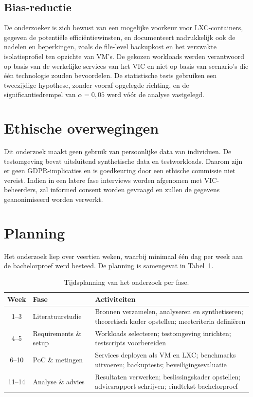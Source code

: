 \subsection{Bias-reductie}
De onderzoeker is zich bewust van een mogelijke voorkeur voor LXC-containers, gegeven de potentiële efficiëntiewinsten, en documenteert nadrukkelijk ook de nadelen en beperkingen, zoals de file-level backupkost en het verzwakte isolatieprofiel ten opzichte van VM's. De gekozen workloads werden verantwoord op basis van de werkelijke services van het VIC en niet op basis van scenario's die één technologie zouden bevoordelen. De statistische tests gebruiken een tweezijdige hypothese, zonder vooraf opgelegde richting, en de significantiedrempel van $\alpha = 0,05$ werd vóór de analyse vastgelegd.

\section{Ethische overwegingen}
\label{sec:ethische-overwegingen}

Dit onderzoek maakt geen gebruik van persoonlijke data van individuen. De testomgeving bevat uitsluitend synthetische data en testworkloads. Daarom zijn er geen GDPR-implicaties en is goedkeuring door een ethische commissie niet vereist. Indien in een latere fase interviews worden afgenomen met VIC-beheerders, zal informed consent worden gevraagd en zullen de gegevens geanonimiseerd worden verwerkt.

\section{Planning}
\label{sec:planning}

Het onderzoek liep over veertien weken, waarbij minimaal één dag per week aan de bachelorproef werd besteed. De planning is samengevat in Tabel~\ref{tab:planning}.

\begin{table}[h]
    \centering
    \caption[Planning onderzoek]{Tijdsplanning van het onderzoek per fase.}
    \label{tab:planning}
    \begin{tabular}{clp{7cm}}
        \toprule
        \textbf{Week} & \textbf{Fase} & \textbf{Activiteiten} \\
        \midrule
        1--3  & Literatuurstudie       & Bronnen verzamelen, analyseren en synthetiseren; theoretisch kader opstellen; meetcriteria definiëren \\
        4--5  & Requirements \& setup   & Workloads selecteren; testomgeving inrichten; testscripts voorbereiden \\
        6--10 & PoC \& metingen         & Services deployen als VM en LXC; benchmarks uitvoeren; backuptests; beveiligingsevaluatie \\
        11--14& Analyse \& advies       & Resultaten verwerken; beslissingskader opstellen; adviesrapport schrijven; eindtekst bachelorproef \\
        \bottomrule
    \end{tabular}
\end{table}
